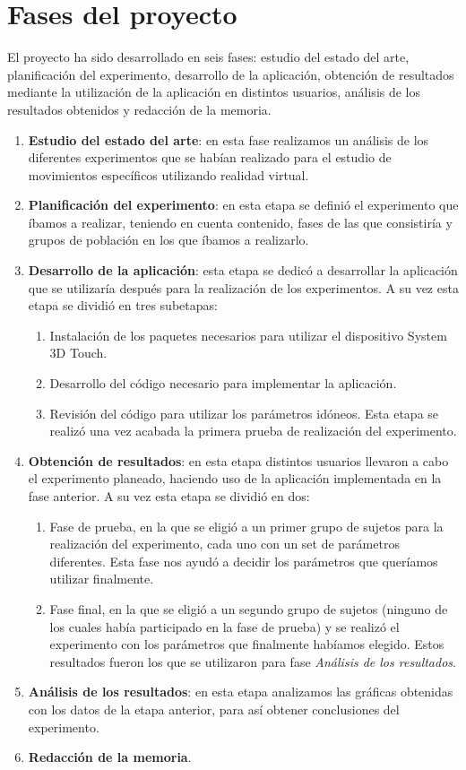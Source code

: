 \documentclass[a4paper,11pt, oneside]{book}
\begin{document}
\section{Fases del proyecto} \label{seccion:fases}
El proyecto ha sido desarrollado en seis fases: estudio del estado del arte, planificación del experimento, desarrollo de la aplicación, obtención de resultados mediante la utilización de la aplicación en distintos usuarios, análisis de los resultados obtenidos y redacción de la memoria. 
\begin{enumerate}
	\item \textbf{Estudio del estado del arte}: en esta fase realizamos un análisis de los diferentes experimentos que se habían realizado para el estudio de movimientos específicos utilizando realidad virtual.
	\item \textbf{Planificación del experimento}: en esta etapa se definió el experimento que íbamos a realizar, teniendo en cuenta contenido, fases de las que consistiría y grupos de población en los que íbamos a realizarlo.
	\item \textbf{Desarrollo de la aplicación}: esta etapa se dedicó a desarrollar la aplicación que se utilizaría después para la realización de los experimentos. A su vez esta etapa se dividió en tres subetapas:
	\begin{enumerate}
		\item Instalación de los paquetes necesarios para utilizar el dispositivo System 3D Touch.
		\item Desarrollo del código necesario para implementar la aplicación.
		\item Revisión del código para utilizar los parámetros idóneos. Esta etapa se realizó una vez acabada la primera prueba de realización del experimento.
	\end{enumerate}
	\item \textbf{Obtención de resultados}: en esta etapa distintos usuarios llevaron a cabo el experimento planeado, haciendo uso de la aplicación implementada en la fase anterior.
	A su vez esta etapa se dividió en dos:
	\begin{enumerate}
		\item Fase de prueba, en la que se eligió a un primer grupo de sujetos para la realización del experimento, cada uno con un set de parámetros diferentes. Esta fase nos ayudó a decidir los parámetros que queríamos utilizar finalmente.
		\item Fase final, en la que se eligió a un segundo grupo de sujetos (ninguno de los cuales había participado en la fase de prueba) y se realizó el experimento con los parámetros que finalmente habíamos elegido.
		Estos resultados fueron los que se utilizaron para fase \textit{Análisis de los resultados}.
	\end{enumerate}
		
	\item \textbf{Análisis de los resultados}: en esta etapa analizamos las gráficas obtenidas con los datos de la etapa anterior, para así obtener conclusiones del experimento.
	
	\item \textbf{Redacción de la memoria}.
\end{enumerate}
\end{document}
